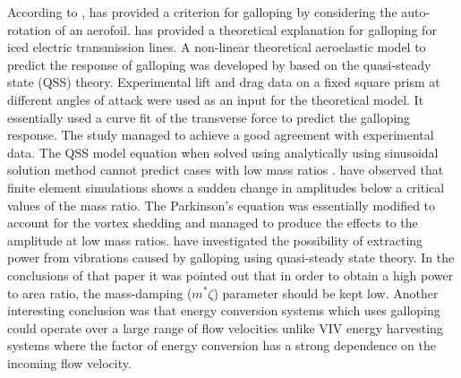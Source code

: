 According to \cite{Paidoussis2010},\cite{Glauert1919} has provided a criterion for galloping by considering the auto-rotation of an aerofoil.  \cite{DenHartog1956}  has provided a theoretical explanation for galloping for iced electric transmission lines. A non-linear theoretical aeroelastic model to predict the response of galloping was developed by \cite{Parkinson1964} based on the quasi-steady state (QSS) theory. Experimental lift and drag data on a fixed square prism at different angles of attack were used as an input for the theoretical model. It essentially used a curve fit of the transverse force to predict the galloping response. The study managed to achieve a good agreement with experimental data. The QSS model equation when solved using analytically using sinusoidal solution method cannot predict cases with low mass ratios  .\cite{Joly2012} have observed that finite element simulations shows a sudden change in amplitudes  below a critical values of the mass ratio. The Parkinson's equation was essentially modified to account for the vortex shedding and managed to produce the effects to the amplitude at low mass ratios.
\cite{Barrero-Gil2010a} have investigated the possibility of extracting power from vibrations caused by galloping using quasi-steady state theory. In the conclusions of that paper it was pointed out that in order to obtain a high power to area ratio, the mass-damping ($m^*\zeta$) parameter should be kept low. Another interesting conclusion was that energy conversion systems which uses galloping could operate over  a large range of flow velocities unlike VIV energy harvesting systems where the factor of energy conversion has a strong dependence on the incoming flow velocity. 